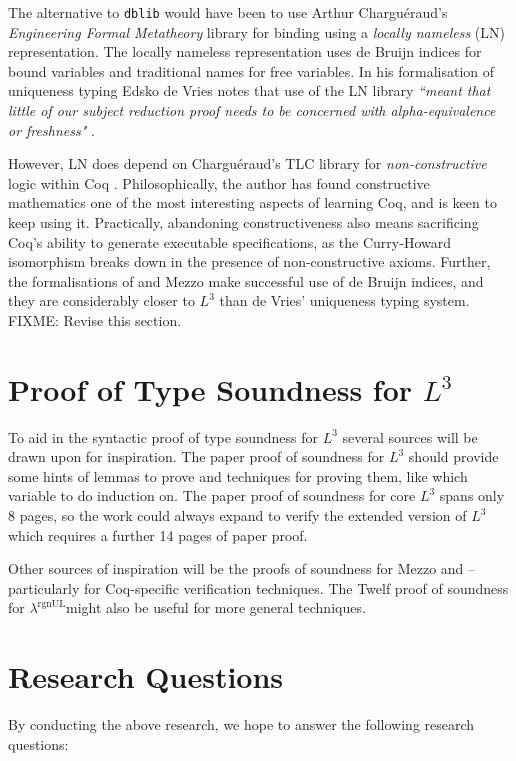 \documentclass[]{unswthesis}
\newcommand{\rgnUL}{$\lambda^\text{rgnUL}$\text{ }}
\newcommand{\SSPHS}{\text{SSPHS }}
\begin{document}
The alternative to \texttt{dblib} would have been to use Arthur Chargu\'{e}raud's \textit{Engineering Formal Metatheory} library \cite{aydemir08} for binding using a \textit{locally nameless} (LN) representation. The locally nameless representation uses de Bruijn indices for bound variables and traditional names for free variables. In his formalisation of uniqueness typing Edsko de Vries notes that use of the LN library \textit{``meant that little of our subject reduction proof needs to be concerned with alpha-equivalence or freshness"} \cite{deVries08}.

However, LN does depend on Chargu\'{e}raud's TLC library for \textit{non-constructive} logic within Coq \cite{tlc15}. Philosophically, the author has found constructive mathematics one of the most interesting aspects of learning Coq, and is keen to keep using it. Practically, abandoning constructiveness also means sacrificing Coq's ability to generate executable specifications, as the Curry-Howard isomorphism breaks down in the presence of non-constructive axioms. Further, the formalisations of \SSPHS and Mezzo make successful use of de Bruijn indices, and they are considerably closer to $L^3$ than de Vries' uniqueness typing system. FIXME: Revise this section.

\section{Proof of Type Soundness for $L^3$}
\label{sec:proof_proposal}

To aid in the syntactic proof of type soundness for $L^3$ several sources will be drawn upon for inspiration. The paper proof of soundness for $L^3$ should provide some hints of lemmas to prove and techniques for proving them, like which variable to do induction on. The paper proof of soundness for core $L^3$ spans only 8 pages, so the work could always expand to verify the extended version of $L^3$ which requires a further 14 pages of paper proof.

Other sources of inspiration will be the proofs of soundness for Mezzo and \SSPHS -- particularly for Coq-specific verification techniques. The Twelf proof of soundness for \rgnUL might also be useful for more general techniques.

\section{Research Questions}

By conducting the above research, we hope to answer the following research questions:
\end{document}
